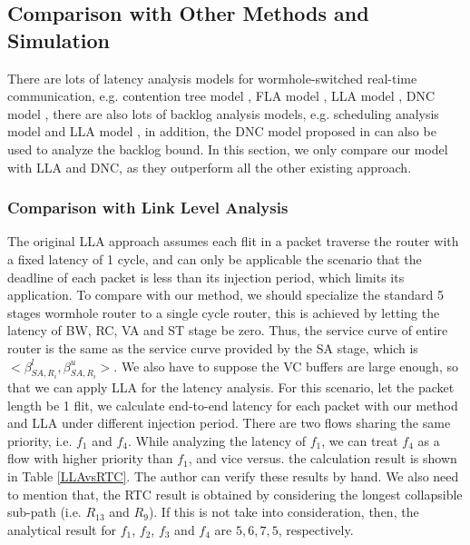 \documentclass[10pt,journal]{IEEEtran}
\begin{document}
\subsection{Comparison with Other Methods and Simulation}
There are lots of latency analysis models for wormhole-switched real-time communication, e.g. contention tree model \cite{LuJS05}, FLA model \cite{Shi:2008:RCA:1397757.1397996}, LLA model \cite{73}, DNC model \cite{Qian489900}, there are also lots of backlog analysis models, e.g. scheduling analysis model \cite{Manolache:2006:BSO:1131481.1131683} and LLA model \cite{189}, in addition, the DNC model proposed in \cite{Qian489900} can also be used to analyze the backlog bound. In this section, we only compare our model with LLA and DNC, as they outperform all the other existing approach.

\subsubsection{Comparison with Link Level Analysis}
The original LLA approach assumes each flit in a packet traverse the router with a fixed latency of 1 cycle, and can only be applicable the scenario that the deadline of each packet is less than its injection period, which limits its application. To compare with our method, we should specialize the standard 5 stages wormhole router to a single cycle router, this is achieved by letting the latency of BW, RC, VA and ST stage be zero. Thus, the service curve of entire router is the same as the service curve provided by the SA stage, which is $<\beta_{SA,R_i}^l,\beta_{SA,R_i}^u>$. We also have to suppose the VC buffers are large enough, so that we can apply LLA for the latency analysis. For this scenario, let the packet length be 1 flit, we calculate end-to-end latency for each packet with our method and LLA under different injection period. There are two flows sharing the same priority, i.e. $f_1$ and $f_4$. While analyzing the latency of $f_1$, we can treat $f_4$ as a flow with higher priority than $f_1$, and vice versus. the calculation result is shown in Table \ref{LLAvsRTC}. The author can verify these results by hand. We also need to mention that, the RTC result is obtained by considering the longest collapsible sub-path (i.e. $R_{13}$ and $R_{9}$). If this is not take into consideration, then, the analytical result for $f_1$, $f_2$, $f_3$ and $f_4$ are $5,6,7,5$, respectively.
\end{document}
